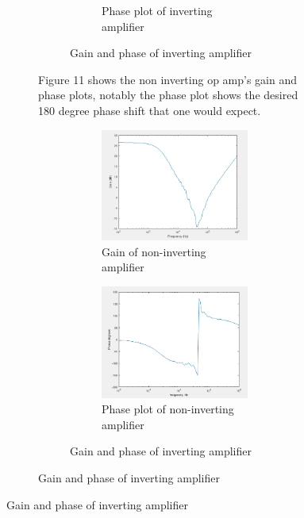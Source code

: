 \begin{figure}[H]
\begin{subfigure}[b]{0.45\textwidth}
\begin{figure}[H]
\begin{subfigure}[b]{0.45\textwidth}
				\caption{Phase plot of inverting amplifier}
				\label{fig:invertingphase}
			\end{subfigure}
		\caption{Gain and phase of inverting amplifier}
		\label{fig:invertamp}
		\end{figure} 
Figure 11 shows the non inverting op amp's gain and phase plots, notably the phase plot shows the desired 180 degree phase shift that one would expect.
	\begin{figure}[H]
		\centering
		\begin{subfigure}[b]{0.45\textwidth}
			\centering
			\includegraphics[scale=.40]{ExperimentalImplementation/gainnoninverting.png}
			\caption{Gain of non-inverting amplifier}
			\label{fig:gainnoninverting}
		\end{subfigure}
		\hfill
		\begin{subfigure}[b]{0.45\textwidth}
			\centering
			\includegraphics[scale=.40]{ExperimentalImplementation/phasenoninverting.png}
			\caption{Phase plot of non-inverting amplifier}
			\label{fig:phasenoninverting}
		\end{subfigure}
		\caption{Gain and phase of inverting amplifier}
		\label{fig:noninvertamp}
	\end{figure} 


\end{subfigure}
\end{figure}
